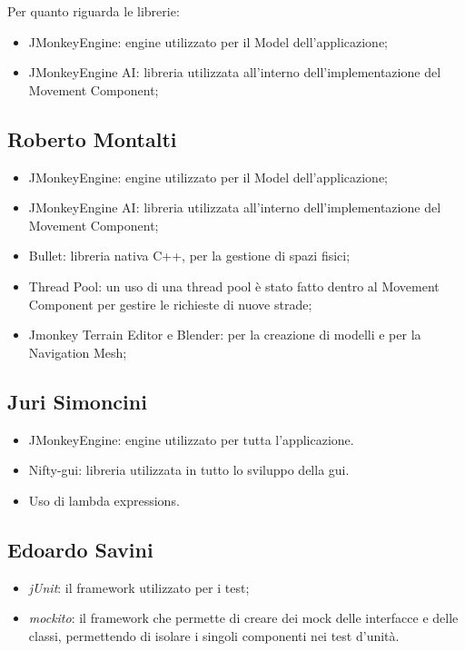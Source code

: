 Per quanto riguarda le librerie:
\begin{itemize}
\item JMonkeyEngine: engine utilizzato per il Model dell'applicazione;
\item JMonkeyEngine AI: libreria utilizzata all'interno dell'implementazione del Movement Component;
\end{itemize}

\subsection{Roberto Montalti}

\begin{itemize}
\item JMonkeyEngine: engine utilizzato per il Model dell'applicazione;
\item JMonkeyEngine AI: libreria utilizzata all'interno dell'implementazione del Movement Component;
\item Bullet: libreria nativa C++, per la gestione di spazi fisici;
\item Thread Pool: un uso di una thread pool è stato fatto dentro al Movement Component per gestire le richieste di nuove strade;
\item Jmonkey Terrain Editor e Blender: per la creazione di modelli e per la Navigation Mesh; 
\end{itemize}

\subsection{Juri Simoncini}

\begin{itemize}
\item JMonkeyEngine: engine utilizzato per tutta l'applicazione.
\item Nifty-gui: libreria utilizzata in tutto lo sviluppo della gui.
\item Uso di lambda expressions.
\end{itemize}

\subsection{Edoardo Savini}

\begin{itemize}
    \item \emph{jUnit}: il framework utilizzato per i test;
    \item \emph{mockito}: il framework che permette di creare dei mock delle interfacce e delle classi, permettendo di isolare i singoli componenti nei test d'unità.
\end{itemize}

